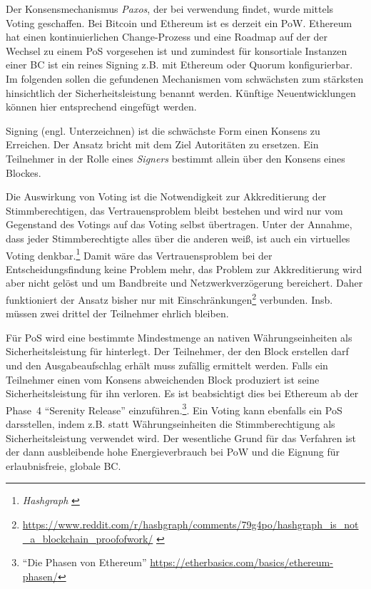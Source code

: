 Der Konsensmechanismus  \emph{Paxos}, der bei  verwendung findet, wurde mittels Voting geschaffen. Bei Bitcoin und Ethereum ist es derzeit ein \gls{PoW}. Ethereum hat einen kontinuierlichen Change-Prozess und eine Roadmap auf der der Wechsel zu einem \gls{PoS}
vorgesehen ist und zumindest für konsortiale Instanzen einer \gls{BC} ist ein reines Signing z.B. mit Ethereum oder Quorum konfigurierbar. Im folgenden sollen die gefundenen Mechanismen vom schwächsten zum stärksten hinsichtlich der Sicherheitsleistung benannt werden.
Künftige Neuentwicklungen können hier entsprechend eingefügt werden.

Signing (engl. Unterzeichnen) ist die schwächste Form einen Konsens zu Erreichen. Der Ansatz bricht mit dem Ziel Autoritäten zu ersetzen.
Ein Teilnehmer in der Rolle eines \emph{Signers} bestimmt %
allein über den Konsens eines Blockes.

Die Auswirkung von Voting ist die Notwendigkeit zur Akkreditierung der Stimmberechtigen, das Vertrauensproblem bleibt bestehen und wird nur vom Gegenstand des Votings auf das Voting selbst übertragen. Unter der Annahme, dass jeder Stimmberechtigte alles über die anderen weiß, ist auch ein virtuelles Voting denkbar.\footnote{\emph{Hashgraph} \autocite{p:hashgraph}} Damit wäre das Vertrauensproblem bei der Entscheidungsfindung keine Problem mehr, das Problem zur Akkreditierung wird aber nicht gelöst und um Bandbreite und Netzwerkverzögerung bereichert. Daher funktioniert der Ansatz bisher nur mit Einschränkungen\footnote{\url{https://www.reddit.com/r/hashgraph/comments/79g4po/hashgraph_is_not_a_blockchain_proofofwork/}  \autocite{w:reddit}} verbunden. Insb. müssen zwei drittel der Teilnehmer ehrlich bleiben.

Für \gls{PoS} wird eine bestimmte Mindestmenge an nativen Währungseinheiten als Sicherheitsleistung für hinterlegt. Der Teilnehmer, der den Block erstellen darf und den Ausgabeaufschlag erhält muss zufällig ermittelt werden. Falls ein Teilnehmer einen vom Konsens abweichenden Block produziert ist seine Sicherheitsleistung für ihn verloren. Es ist beabsichtigt dies bei Ethereum ab der Phase~4 \enquote{Serenity Release} einzuführen.\footnote{\enquote{Die Phasen von Ethereum} \url{https://etherbasics.com/basics/ethereum-phasen/}}. Ein Voting kann ebenfalls ein \gls{PoS} darsstellen, indem z.B. statt Währungseinheiten die Stimmberechtigung als Sicherheitsleistung verwendet wird. Der wesentliche Grund für das Verfahren ist der dann ausbleibende hohe Energieverbrauch bei \gls{PoW} und die Eignung für erlaubnisfreie, globale \gls{BC}.

